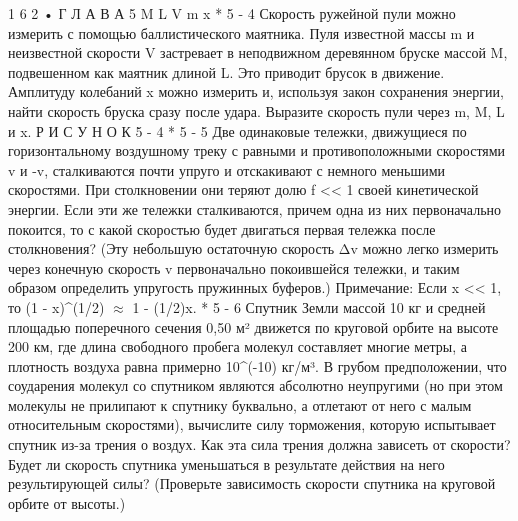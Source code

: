 \documentclass[10pt,oneside]{article}
\begin{document}
1 6 2 • Г Л А В А  5 M L V m x \emph{ } * 5 - 4 Скорость ружейной пули можно измерить с помощью баллистического маятника. Пуля известной массы m и неизвестной скорости V застревает в неподвижном деревянном бруске массой M, подвешенном как маятник длиной L. Это приводит брусок в движение. Амплитуду колебаний x можно измерить и, используя закон сохранения энергии, найти скорость бруска сразу после удара. Выразите скорость пули через m, M, L и x. Р И С У Н О К  5 - 4 \emph{ } * 5 - 5 Две одинаковые тележки, движущиеся по горизонтальному воздушному треку с равными и противоположными скоростями v и -v, сталкиваются почти упруго и отскакивают с немного меньшими скоростями. При столкновении они теряют долю f << 1 своей кинетической энергии. Если эти же тележки сталкиваются, причем одна из них первоначально покоится, то с какой скоростью будет двигаться первая тележка после столкновения? (Эту небольшую остаточную скорость Δv можно легко измерить через конечную скорость v первоначально покоившейся тележки, и таким образом определить упругость пружинных буферов.) Примечание: Если x << 1, то (1 - x)\textasciicircum{}(1/2) \ensuremath{\approx} 1 - (1/2)x. \emph{ } * 5 - 6 Спутник Земли массой 10 кг и средней площадью поперечного сечения 0,50 м² движется по круговой орбите на высоте 200 км, где длина свободного пробега молекул составляет многие метры, а плотность воздуха равна примерно 10\textasciicircum{}(-10) кг/м³. В грубом предположении, что соударения молекул со спутником являются абсолютно неупругими (но при этом молекулы не прилипают к спутнику буквально, а отлетают от него с малым относительным скоростями), вычислите силу торможения, которую испытывает спутник из-за трения о воздух. Как эта сила трения должна зависеть от скорости? Будет ли скорость спутника уменьшаться в результате действия на него результирующей силы? (Проверьте зависимость скорости спутника на круговой орбите от высоты.)\par
\end{document}
